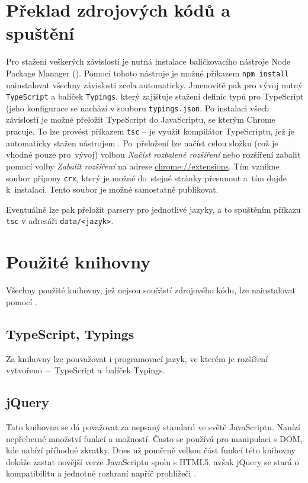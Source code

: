 \section{Překlad zdrojových kódů a spuštění}
\label{label:compilation}
Pro stažení veškerých závislostí je nutná instalace balíčkovacího nástroje Node Package Manager (). Pomocí tohoto nástroje je možné příkazem \texttt{npm install} nainstalovat všechny závislosti zcela automaticky. Jmenovitě pak pro vývoj nutný \texttt{Type\-Script} a balíček \texttt{Typings}, který zajišťuje stažení definic typů pro TypeScript (jeho konfigurace se nachází v souboru \texttt{typings.json}. Po instalaci všech závislostí je možné přeložit TypeScript do JavaScriptu, se kterým Chrome pracuje. To lze provést příkazem \texttt{tsc} -- je využit kompilátor TypeScriptu, jež je automaticky stažen nástrojem . Po~přeložení lze načíst celou složku (což je vhodné pouze pro~vývoj) volbou \textit{Načíst rozbalené rozšíření} nebo rozšíření zabalit pomocí volby \textit{Zabalit rozšíření} na adrese \url{chrome://extensions}. Tím vznikne soubor přípony \texttt{crx}, který je možné do~stejné stránky přesunout a~tím dojde k~instalaci. Tento soubor je možné samostatně publikovat.

Eventuálně lze pak přeložit parsery pro jednotlivé jazyky, a to spuštěním příkazu \texttt{tsc} v adresáři \texttt{data/<jazyk>}. 
\section{Použité knihovny}
Všechny použité knihovny, jež nejsou součástí zdrojového kódu, lze nainstalovat pomocí .

\subsection{TypeScript, Typings}
Za knihovny lze pouvažovat i programovací jazyk, ve kterém je rozšíření vy\-tvo\-ře\-no~--~Ty\-pe\-Script a~balíček Typings.

\subsection{jQuery}
Tato knihovna se dá považovat za nepsaný standard ve světě JavaScriptu. Nanízí nepřeberné množství funkcí a možností. Často se používá pro manipulaci s DOM, kde nabízí příhodné zkratky. Dnes už poměrně velkou část funkcí této knihovny dokáže zastat novější verze JavaScriptu spolu s HTML5, avšak jQuery se stará o kompatibilitu a jednotné rozhraní napříč prohlížeči \cite{jqueryuse}.


